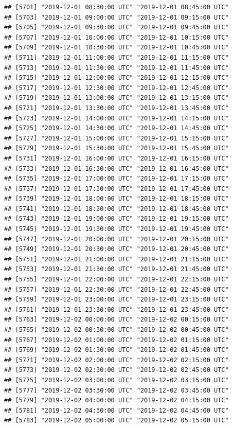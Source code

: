 \documentclass{article}\usepackage[]{graphicx}\usepackage[]{color}
\makeatletter
\newenvironment{kframe}{%
 \def\at@end@of@kframe{}%
 \ifinner\ifhmode%
  \def\at@end@of@kframe{\end{minipage}}%
  \begin{minipage}{\columnwidth}%
 \fi\fi%
 \def\FrameCommand##1{\hskip\@totalleftmargin \hskip-\fboxsep
 \colorbox{shadecolor}{##1}\hskip-\fboxsep
     \hskip-\linewidth \hskip-\@totalleftmargin \hskip\columnwidth}%
 \MakeFramed {\advance\hsize-\width
   \@totalleftmargin\z@ \linewidth\hsize
   \@setminipage}}%
 {\par\unskip\endMakeFramed%
 \at@end@of@kframe}
\newenvironment{knitrout}{}{} %
\makeatother
\begin{document}
\begin{knitrout}
\begin{kframe}
\begin{verbatim}
## [5701] "2019-12-01 08:30:00 UTC" "2019-12-01 08:45:00 UTC"
## [5703] "2019-12-01 09:00:00 UTC" "2019-12-01 09:15:00 UTC"
## [5705] "2019-12-01 09:30:00 UTC" "2019-12-01 09:45:00 UTC"
## [5707] "2019-12-01 10:00:00 UTC" "2019-12-01 10:15:00 UTC"
## [5709] "2019-12-01 10:30:00 UTC" "2019-12-01 10:45:00 UTC"
## [5711] "2019-12-01 11:00:00 UTC" "2019-12-01 11:15:00 UTC"
## [5713] "2019-12-01 11:30:00 UTC" "2019-12-01 11:45:00 UTC"
## [5715] "2019-12-01 12:00:00 UTC" "2019-12-01 12:15:00 UTC"
## [5717] "2019-12-01 12:30:00 UTC" "2019-12-01 12:45:00 UTC"
## [5719] "2019-12-01 13:00:00 UTC" "2019-12-01 13:15:00 UTC"
## [5721] "2019-12-01 13:30:00 UTC" "2019-12-01 13:45:00 UTC"
## [5723] "2019-12-01 14:00:00 UTC" "2019-12-01 14:15:00 UTC"
## [5725] "2019-12-01 14:30:00 UTC" "2019-12-01 14:45:00 UTC"
## [5727] "2019-12-01 15:00:00 UTC" "2019-12-01 15:15:00 UTC"
## [5729] "2019-12-01 15:30:00 UTC" "2019-12-01 15:45:00 UTC"
## [5731] "2019-12-01 16:00:00 UTC" "2019-12-01 16:15:00 UTC"
## [5733] "2019-12-01 16:30:00 UTC" "2019-12-01 16:45:00 UTC"
## [5735] "2019-12-01 17:00:00 UTC" "2019-12-01 17:15:00 UTC"
## [5737] "2019-12-01 17:30:00 UTC" "2019-12-01 17:45:00 UTC"
## [5739] "2019-12-01 18:00:00 UTC" "2019-12-01 18:15:00 UTC"
## [5741] "2019-12-01 18:30:00 UTC" "2019-12-01 18:45:00 UTC"
## [5743] "2019-12-01 19:00:00 UTC" "2019-12-01 19:15:00 UTC"
## [5745] "2019-12-01 19:30:00 UTC" "2019-12-01 19:45:00 UTC"
## [5747] "2019-12-01 20:00:00 UTC" "2019-12-01 20:15:00 UTC"
## [5749] "2019-12-01 20:30:00 UTC" "2019-12-01 20:45:00 UTC"
## [5751] "2019-12-01 21:00:00 UTC" "2019-12-01 21:15:00 UTC"
## [5753] "2019-12-01 21:30:00 UTC" "2019-12-01 21:45:00 UTC"
## [5755] "2019-12-01 22:00:00 UTC" "2019-12-01 22:15:00 UTC"
## [5757] "2019-12-01 22:30:00 UTC" "2019-12-01 22:45:00 UTC"
## [5759] "2019-12-01 23:00:00 UTC" "2019-12-01 23:15:00 UTC"
## [5761] "2019-12-01 23:30:00 UTC" "2019-12-01 23:45:00 UTC"
## [5763] "2019-12-02 00:00:00 UTC" "2019-12-02 00:15:00 UTC"
## [5765] "2019-12-02 00:30:00 UTC" "2019-12-02 00:45:00 UTC"
## [5767] "2019-12-02 01:00:00 UTC" "2019-12-02 01:15:00 UTC"
## [5769] "2019-12-02 01:30:00 UTC" "2019-12-02 01:45:00 UTC"
## [5771] "2019-12-02 02:00:00 UTC" "2019-12-02 02:15:00 UTC"
## [5773] "2019-12-02 02:30:00 UTC" "2019-12-02 02:45:00 UTC"
## [5775] "2019-12-02 03:00:00 UTC" "2019-12-02 03:15:00 UTC"
## [5777] "2019-12-02 03:30:00 UTC" "2019-12-02 03:45:00 UTC"
## [5779] "2019-12-02 04:00:00 UTC" "2019-12-02 04:15:00 UTC"
## [5781] "2019-12-02 04:30:00 UTC" "2019-12-02 04:45:00 UTC"
## [5783] "2019-12-02 05:00:00 UTC" "2019-12-02 05:15:00 UTC"

\end{verbatim}
\end{kframe}
\end{knitrout}
\end{document}

